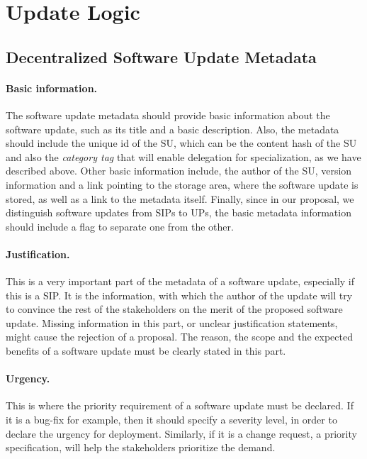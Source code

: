\section{Update Logic}

\subsection{Decentralized Software Update Metadata} \label{appxmetadata}
\paragraph{Basic information.}The software update metadata should provide basic information about the software update, such as its title and a basic description. Also, the metadata should include the unique id of the SU, which can be the content hash of the SU and also the \emph{category tag} that will enable delegation for specialization, as we have described above. Other basic information include, the author of the SU, version information and a link pointing to the storage area, where the software update is stored, as well as a link to the metadata itself. Finally, since in our proposal, we distinguish software updates from SIPs to UPs, the basic metadata information should include a flag to separate one from the other.
\paragraph{Justification.} This is a very important part of the metadata of a software update, especially if this is a SIP. It is the information, with which the author of the update will try to convince the rest of the stakeholders on the merit of the proposed software update. Missing information in this part, or unclear justification statements, might cause the rejection of a proposal. The reason, the scope and the expected benefits of a software update must be clearly stated in this part.
\paragraph{Urgency.} This is where the priority requirement of a software update must be declared. If it is a bug-fix for example, then it should specify a severity level, in order to declare the urgency for deployment. Similarly, if it is a change request, a priority specification, will help the stakeholders prioritize the demand.
